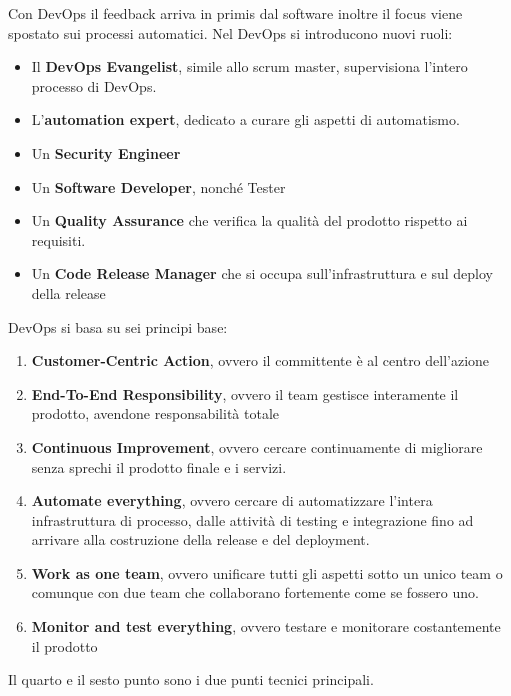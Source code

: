Con DevOps il feedback arriva in primis dal software inoltre il focus viene
spostato sui processi automatici. Nel DevOps si introducono nuovi ruoli:
\begin{itemize}
    \item Il \textbf{DevOps Evangelist}, simile allo scrum master, supervisiona
          l'intero processo di DevOps.
    \item L'\textbf{automation expert}, dedicato a curare gli aspetti di automatismo.
    \item Un \textbf{Security Engineer}
    \item Un \textbf{Software Developer}, nonché Tester
    \item Un \textbf{Quality Assurance} che verifica la qualità del prodotto
          rispetto ai requisiti.
    \item Un\textbf{ Code Release Manager} che si occupa sull'infrastruttura e
          sul deploy della release
\end{itemize}

DevOps si basa su sei principi base:
\begin{enumerate}
    \item \textbf{Customer-Centric Action}, ovvero il committente è al centro
          dell'azione
    \item \textbf{End-To-End Responsibility}, ovvero il team gestisce interamente
          il prodotto, avendone responsabilità totale
    \item \textbf{Continuous Improvement}, ovvero cercare continuamente di
          migliorare senza sprechi il prodotto finale e i servizi.
    \item \textbf{Automate everything}, ovvero cercare di automatizzare l'intera
          infrastruttura di processo, dalle attività di testing e integrazione fino ad
          arrivare alla costruzione della release e del deployment.
    \item \textbf{Work as one team}, ovvero unificare tutti gli aspetti sotto un
          unico team o comunque con due team che collaborano fortemente come se fossero uno.
    \item \textbf{Monitor and test everything}, ovvero testare e monitorare
          costantemente il prodotto
\end{enumerate}

Il quarto e il sesto punto sono i due punti tecnici principali.
